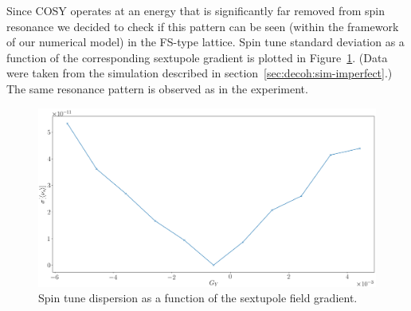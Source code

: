 Since COSY operates at an energy that is significantly far removed from spin resonance 
we decided to check if this pattern can be seen (within the framework of our numerical model) 
in the FS-type lattice. 
Spin tune standard deviation as a function of the corresponding sextupole gradient is plotted in Figure~\ref{fig:SCT_resonance}. 
(Data were taken from the simulation described in section~\ref{sec:decoh:sim-imperfect}.)
The same resonance pattern is observed as in the experiment.

\begin{figure}[h]
	\centering
	\includegraphics[width=\linewidth]{images/decoh_sim/stune_sd_vs_sext_strength_resonance}
	\caption{Spin tune dispersion as a function of the sextupole field gradient.\label{fig:SCT_resonance}}
\end{figure}
